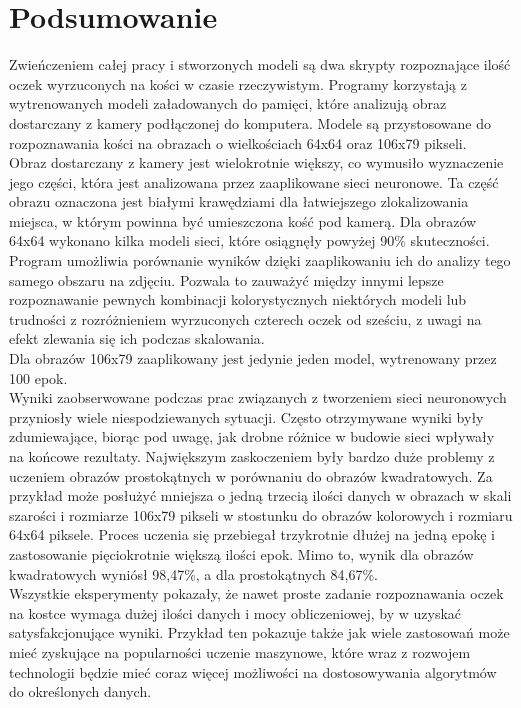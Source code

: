 
\chapter{Podsumowanie}

Zwieńczeniem całej pracy i stworzonych modeli są dwa skrypty rozpoznające ilość
oczek wyrzuconych na kości w czasie rzeczywistym. Programy korzystają z wytrenowanych
modeli załadowanych do pamięci, które analizują obraz dostarczany z kamery
podłączonej do komputera. Modele są przystosowane do rozpoznawania kości na
obrazach o wielkościach 64x64 oraz 106x79 pikseli.\\
Obraz dostarczany z kamery jest wielokrotnie większy, co wymusiło wyznaczenie jego
części, która jest analizowana przez zaaplikowane sieci neuronowe. Ta część obrazu
oznaczona jest białymi krawędziami dla łatwiejszego zlokalizowania miejsca, w którym
powinna być umieszczona kość pod kamerą.
Dla obrazów 64x64 wykonano kilka modeli sieci, które osiągnęły powyżej 90\% skuteczności.
Program umożliwia porównanie wyników dzięki zaaplikowaniu ich do analizy tego
samego obszaru na zdjęciu. Pozwala to zauważyć między innymi lepsze rozpoznawanie
pewnych kombinacji kolorystycznych niektórych modeli lub trudności z rozróżnieniem
wyrzuconych czterech oczek od sześciu, z uwagi na efekt zlewania się ich podczas
skalowania.\\
Dla obrazów 106x79 zaaplikowany jest jedynie jeden model, wytrenowany przez 100 epok.\\
Wyniki zaobserwowane podczas prac związanych z tworzeniem sieci neuronowych przyniosły
wiele niespodziewanych sytuacji. Często otrzymywane wyniki były zdumiewające,
biorąc pod uwagę, jak drobne różnice w budowie sieci wpływały na końcowe rezultaty.
Największym zaskoczeniem były bardzo duże problemy z uczeniem obrazów prostokątnych w
porównaniu do obrazów kwadratowych. Za przykład może posłużyć mniejsza o jedną trzecią
ilości danych w obrazach w skali szarości i rozmiarze 106x79 pikseli w stostunku do
obrazów kolorowych i rozmiaru 64x64 piksele. Proces uczenia się przebiegał trzykrotnie
dłużej na jedną epokę i zastosowanie pięciokrotnie większą ilości epok. Mimo to, wynik
dla obrazów kwadratowych wyniósł 98,47\%, a dla prostokątnych 84,67\%.\\
Wszystkie eksperymenty pokazały, że nawet proste zadanie rozpoznawania oczek na kostce
wymaga dużej ilości danych i mocy obliczeniowej, by w uzyskać satysfakcjonujące wyniki.
Przykład ten pokazuje także jak wiele zastosowań może mieć zyskujące na popularności
uczenie maszynowe, które wraz z rozwojem technologii będzie mieć coraz więcej możliwości
na dostosowywania algorytmów do określonych danych.
